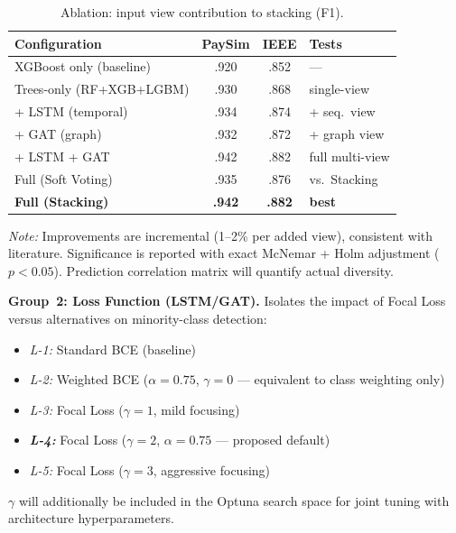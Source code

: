 \documentclass[10pt,a4paper,twocolumn]{article}
\begin{document}
\begin{table}[H]
\centering
\caption{Ablation: input view contribution to stacking (F1).}
\label{tab:ablation}
{\small
\begin{tabularx}{\columnwidth}{Xccl}
\toprule
\textbf{Configuration} & \textbf{PaySim} & \textbf{IEEE} & \textbf{Tests} \\
\midrule
XGBoost only (baseline)   & .920 & .852 & --- \\
Trees-only (RF+XGB+LGBM)  & .930 & .868 & single-view \\
\quad + LSTM (temporal)    & .934 & .874 & + seq.\ view \\
\quad + GAT (graph)        & .932 & .872 & + graph view \\
\quad + LSTM + GAT         & .942 & .882 & full multi-view \\
\midrule
Full (Soft Voting)         & .935 & .876 & vs.\ Stacking \\
\textbf{Full (Stacking)}   & \textbf{.942} & \textbf{.882} & \textbf{best} \\
\bottomrule
\end{tabularx}
}
\vspace{2pt}
{\scriptsize\textit{Note:} Improvements are incremental (1--2\% per added view), consistent with literature. Significance is reported with exact McNemar + Holm adjustment ($p<0.05$). Prediction correlation matrix will quantify actual diversity.}
\end{table}

\noindent{}

\textbf{Group~2: Loss Function (LSTM/GAT).} Isolates the impact of Focal Loss versus alternatives on minority-class detection:
\begin{itemize}[nosep]
    \item \textit{L-1:} Standard BCE (baseline)
    \item \textit{L-2:} Weighted BCE ($\alpha{=}0.75$, $\gamma{=}0$ --- equivalent to class weighting only)
    \item \textit{L-3:} Focal Loss ($\gamma{=}1$, mild focusing)
    \item \textbf{\textit{L-4:}} Focal Loss ($\gamma{=}2$, $\alpha{=}0.75$ --- proposed default)
    \item \textit{L-5:} Focal Loss ($\gamma{=}3$, aggressive focusing)
\end{itemize}
\noindent$\gamma$ will additionally be included in the Optuna search space for joint tuning with architecture hyperparameters.
\end{document}
